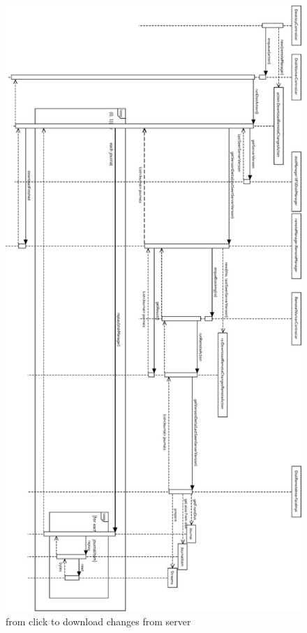 \begin{figure}[h!]
\centering
\includegraphics[height=\textheight,width=\textwidth,keepaspectratio]{figures/22downloadChanges.eps}
\caption{from click to download changes from server}
\label{fig:22downloadChanges}
\end{figure}


